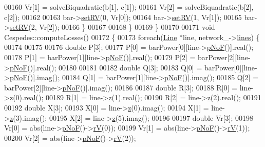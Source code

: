 \begin{DoxyCode}
00160       Vr[1] = solveBiquadratic(b[1], c[1]);
00161       Vr[2] = solveBiquadratic(b[2], c[2]);
00162 
00163       bar->\hyperlink{group___models_ga96ab396a6e953a0356f60adb1784ee37}{setRV}(0, Vr[0]);
00164       bar->\hyperlink{group___models_ga96ab396a6e953a0356f60adb1784ee37}{setRV}(1, Vr[1]);
00165       bar->\hyperlink{group___models_ga96ab396a6e953a0356f60adb1784ee37}{setRV}(2, Vr[2]);
00166     \}
00167 
00168   \}
00169 \}
00170 
00171 \textcolor{keywordtype}{void} Cespedes::computeLosses()
00172 \{
00173   \textcolor{keywordflow}{foreach}(\hyperlink{class_line}{Line} *line, network\_->\hyperlink{class_network_a49659f95d02baf087707c5a94fa23d90}{lines}) \{
00174 
00175 
00176     \textcolor{keywordtype}{double} P[3];
00177     P[0] = barPower[0][line->\hyperlink{group___models_gabbc73ddedd3075c33ae5331bd7c9829f}{pNoF}()].real();
00178     P[1] = barPower[1][line->\hyperlink{group___models_gabbc73ddedd3075c33ae5331bd7c9829f}{pNoF}()].real();
00179     P[2] = barPower[2][line->\hyperlink{group___models_gabbc73ddedd3075c33ae5331bd7c9829f}{pNoF}()].real();
00180 
00181 
00182     \textcolor{keywordtype}{double} Q[3];
00183     Q[0] = barPower[0][line->\hyperlink{group___models_gabbc73ddedd3075c33ae5331bd7c9829f}{pNoF}()].imag();
00184     Q[1] = barPower[1][line->\hyperlink{group___models_gabbc73ddedd3075c33ae5331bd7c9829f}{pNoF}()].imag();
00185     Q[2] = barPower[2][line->\hyperlink{group___models_gabbc73ddedd3075c33ae5331bd7c9829f}{pNoF}()].imag();
00186 
00187     \textcolor{keywordtype}{double} R[3];
00188     R[0] = line->\hyperlink{group___models_ga0b44ccb2f14635c42d7eab3fe8940692}{z}(0).real();
00189     R[1] = line->\hyperlink{group___models_ga0b44ccb2f14635c42d7eab3fe8940692}{z}(1).real();
00190     R[2] = line->\hyperlink{group___models_ga0b44ccb2f14635c42d7eab3fe8940692}{z}(2).real();
00191 
00192     \textcolor{keywordtype}{double} X[3];
00193     X[0] = line->\hyperlink{group___models_ga0b44ccb2f14635c42d7eab3fe8940692}{z}(0).imag();
00194     X[1] = line->\hyperlink{group___models_ga0b44ccb2f14635c42d7eab3fe8940692}{z}(3).imag();
00195     X[2] = line->\hyperlink{group___models_ga0b44ccb2f14635c42d7eab3fe8940692}{z}(5).imag();
00196 
00197     \textcolor{keywordtype}{double} Vr[3];
00198     Vr[0] = abs(line->\hyperlink{group___models_gabbc73ddedd3075c33ae5331bd7c9829f}{pNoF}()->\hyperlink{group___models_ga6c83eb997f5038e0b9bbd5472582e0a8}{rV}(0));
00199     Vr[1] = abs(line->\hyperlink{group___models_gabbc73ddedd3075c33ae5331bd7c9829f}{pNoF}()->\hyperlink{group___models_ga6c83eb997f5038e0b9bbd5472582e0a8}{rV}(1));
00200     Vr[2] = abs(line->\hyperlink{group___models_gabbc73ddedd3075c33ae5331bd7c9829f}{pNoF}()->\hyperlink{group___models_ga6c83eb997f5038e0b9bbd5472582e0a8}{rV}(2));

\end{DoxyCode}
